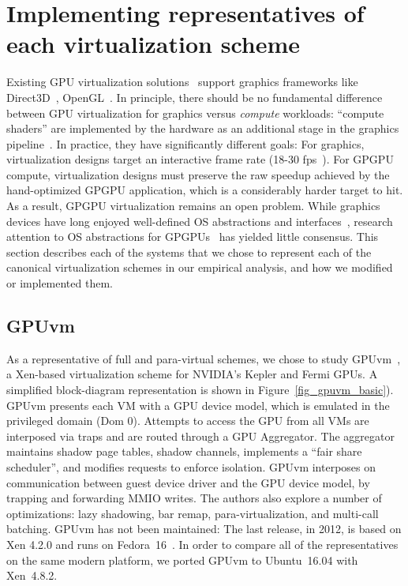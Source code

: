 
\section{Implementing representatives of each virtualization scheme}
\label{representative}

Existing GPU virtualization solutions~\cite{dowty2009gpu, VGML} support
graphics frameworks like Direct3D~\cite{directX}, OpenGL~\cite{openGLspec}.
In principle, there should be no fundamental difference between GPU
virtualization for graphics versus \emph{compute} workloads: ``compute
shaders'' are implemented by the hardware as an additional stage in the
graphics pipeline~\cite{gpu_shader}. In practice, they have significantly
different goals: For graphics, virtualization designs target an interactive
frame rate (18-30 fps~\cite{frame_rate}). For GPGPU compute, virtualization
designs must preserve the raw speedup achieved by the hand-optimized GPGPU
application, which is a considerably harder target to hit. As a result, GPGPU
virtualization remains an open problem. While graphics devices have long
enjoyed well-defined OS abstractions and interfaces~\cite{winGDI}, research
attention to OS abstractions for GPGPUs~\cite{rossbach2011ptask, dandelion,
silberstein2013gpufs, timegraph, gdev, gpunet} has yielded little consensus.
This section describes each of the systems that we chose to represent each of
the canonical virtualization schemes in our empirical analysis, and how we modified or implemented them.

\subsection{GPUvm}
As a representative of full and para-virtual schemes, we chose to study
GPUvm~\cite{suzuki2014gpuvm}, a Xen-based virtualization scheme for NVIDIA's
Kepler and Fermi GPUs. A simplified block-diagram representation is shown in
Figure~\ref{fig_gpuvm_basic}). GPUvm presents each VM with a GPU device model,
which is emulated in the privileged domain (Dom 0). Attempts to access the GPU
from all VMs are interposed via traps and are routed through a GPU Aggregator.
The  aggregator maintains shadow page tables, shadow channels, implements a
``fair share scheduler'', and modifies requests to enforce isolation. GPUvm
interposes on communication between guest device driver and the GPU device
model, by trapping and forwarding MMIO writes. The authors also explore a
number of optimizations: lazy shadowing, bar remap, para-virtualization, and
multi-call batching. GPUvm has not been maintained: The last release, in 2012,
is based on Xen 4.2.0 and runs on Fedora~16~\cite{yu2017fullvirt}. In order to
compare all of the representatives on the same modern platform, we ported
GPUvm to Ubuntu~16.04 with Xen~4.8.2.

